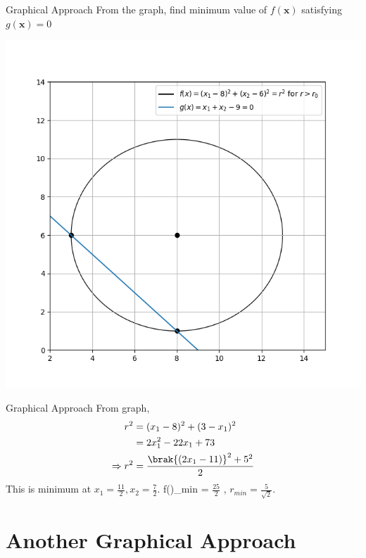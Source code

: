\documentclass[10pt]{beamer}
\begin{document}
{
\begin{frame}{Graphical Approach}
From the graph, find minimum value of $f(\textbf{x})$ satisfying $g(\textbf{x}) = 0$
  \graphicspath{ {./images/} }
    \includegraphics[scale=0.45,center]{2D_3}
\end{frame}
}
{
\begin{frame}{Graphical Approach}
From graph, \newline
%
\begin{align}
r^2 & = (x_1-8)^2 + (3- x_1)^2 \\
&= 2 x_1^2 - 22 x_1 + 73 \\
\Rightarrow r^2 &= \frac{\brak{(2x_1-11)}^2 + 5^2}{2}
\end{align}
%
This is minimum at $x_1 = \frac{11}{2}, x_2 = \frac{7}{2}$.  
\newline f()_{min} = $\frac{25}{2}$ , $r_{min} = \frac{5}{\sqrt{2}}$. 
\end{frame}
}

\section{Another Graphical Approach}
\end{document}
